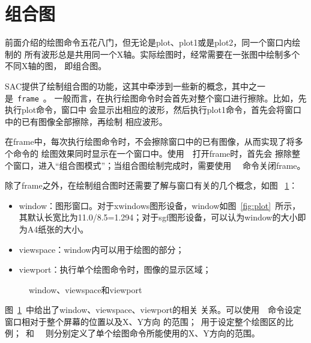 \section{组合图}
\label{sec:composite-plots}

前面介绍的绘图命令五花八门，但无论是plot、plot1或是plot2，同一个窗口内绘制的
所有波形总是共用同一个X轴。实际绘图时，经常需要在一张图中绘制多个不同X轴的图，
即组合图。

SAC提供了绘制组合图的功能，这其中牵涉到一些新的概念，其中之一是~\verb+frame+~。
一般而言，在执行绘图命令时会首先对整个窗口进行擦除。比如，先执行plot命令，窗口中
会显示出相应的波形，然后执行plot1命令，首先会将窗口中的已有图像全部擦除，再绘制
相应波形。

在frame中，每次执行绘图命令时，不会擦除窗口中的已有图像，从而实现了将多个命令的
绘图效果同时显示在一个窗口中。使用~~打开frame时，首先会
擦除整个窗口，进入``组合图模式''；当组合图绘制完成时，需要使用~~
命令关闭frame。

除了frame之外，在绘制组合图时还需要了解与窗口有关的几个概念，如图
~\ref{fig:window-viewspace-viewport}：
\begin{itemize}
\item window：图形窗口。对于xwindows图形设备，window如图~\ref{fig:plot}~所示，
    其默认长宽比为11.0/8.5=1.294；对于sgf图形设备，可以认为window的大小即为A4纸张的大小。
\item viewspace：window内可以用于绘图的部分；
\item viewport：执行单个绘图命令时，图像的显示区域；
\end{itemize}

\begin{figure}[H]
\centering
{}
\caption{window、viewspace和viewport}
\label{fig:window-viewspace-viewport}
\end{figure}

图~\ref{fig:window-viewspace-viewport}~中给出了window、viewspace、viewport的相关
关系。可以使用~~命令设定窗口相对于整个屏幕的位置以及X、Y方向
的范围；~用于设定整个绘图区的比例；~和
~~则分别定义了单个绘图命令所能使用的X、Y方向的范围。

